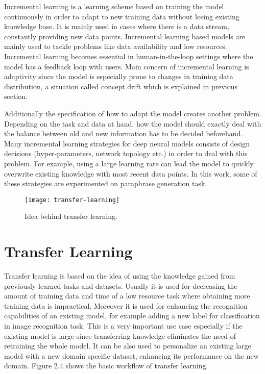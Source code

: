 Incremental learning is a learning scheme based on training the model continuously in order to adapt to new training data without losing existing knowledge base. It is mainly used in cases where there is a data stream, constantly providing new data points. Incremental learning based models are mainly used to tackle problems like data availability and low resources. Incremental learning becomes essential in human-in-the-loop settings where the model has a feedback loop with users. Main concern of incremental learning is adaptivity since the model is especially prone to changes in training data distribution, a situation called concept drift which is explained in previous section. 

Additionally the specification of how to adapt the model creates another problem. Depending on the task and data at hand, how the model should exactly deal with the balance between old and new information has to be decided beforehand. Many incremental learning strategies for deep neural models consists of design decisions (hyper-parameters, network topology etc.) in order to deal with this problem. For example, using a large learning rate can lead the model to quickly overwrite existing knowledge with most recent data points. In this work, some of these strategies are experimented on paraphrase generation task.

\begin{figure}[t]
\texttt{[image: transfer-learning]}
\centering
\caption{Idea behind transfer learning.}
\end{figure}

\section{Transfer Learning}

Transfer learning is based on the idea of using the knowledge gained from previously learned tasks and datasets. Usually it is used for decreasing the amount of training data and time of a low resource task where obtaining more training data is impractical. Moreover it is used for enhancing the recognition capabilities of an existing model, for example adding a new label for classification in image recognition task. This is a very important use case especially if the existing model is large since transferring knowledge eliminates the need of retraining the whole model. It can be also used to personalize an existing large model with a new domain specific dataset, enhancing its performance on the new domain. Figure 2.4 shows the basic workflow of transfer learning.

